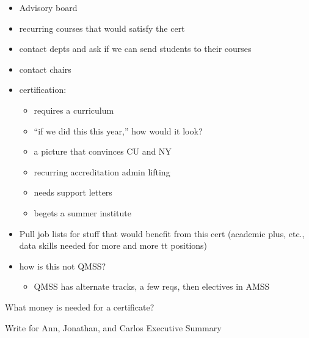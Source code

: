 \documentclass[%
  ,
  article,
  ,
  oneside
  ]{memoir}
\begin{document}
\begin{itemize}
\tightlist
\item
  Advisory board
\item
  recurring courses that would satisfy the cert
\item
  contact depts and ask if we can send students to their courses
\item
  contact chairs
\item
  certification:

  \begin{itemize}
  \tightlist
  \item
    requires a curriculum
  \item
    ``if we did this this year,'' how would it look?
  \item
    a picture that convinces CU and NY
  \item
    recurring accreditation admin lifting
  \item
    needs support letters
  \item
    begets a summer institute
  \end{itemize}
\item
  Pull job lists for stuff that would benefit from this cert (academic
  plus, etc., data skills needed for more and more tt positions)
\item
  how is this not QMSS?

  \begin{itemize}
  \tightlist
  \item
    QMSS has alternate tracks, a few reqs, then electives in AMSS
  \end{itemize}
\end{itemize}

What money is needed for a certificate?

Write for Ann, Jonathan, and Carlos Executive Summary
\end{document}

